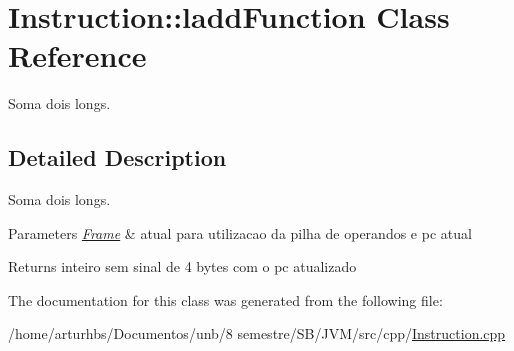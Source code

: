 \hypertarget{classInstruction_1_1laddFunction}{}\section{Instruction\+:\+:ladd\+Function Class Reference}
\label{classInstruction_1_1laddFunction}


Soma dois longs.  




\subsection{Detailed Description}
Soma dois longs. 


\begin{DoxyParams}{Parameters}
{\em \hyperlink{classFrame}{Frame}} & atual para utilizacao da pilha de operandos e pc atual \\
\hline
\end{DoxyParams}
\begin{DoxyReturn}{Returns}
inteiro sem sinal de 4 bytes com o pc atualizado 
\end{DoxyReturn}


The documentation for this class was generated from the following file\+:\begin{DoxyCompactItemize}
\item 
/home/arturhbs/\+Documentos/unb/8 semestre/\+S\+B/\+J\+V\+M/src/cpp/\hyperlink{Instruction_8cpp}{Instruction.\+cpp}\end{DoxyCompactItemize}
